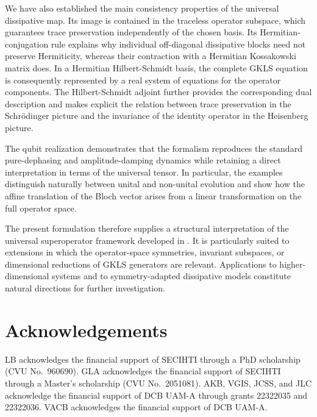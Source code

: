 \documentclass[notitlepage,aip,reprint,onecolumn]{revtex4-1}
\theoremstyle{definition}
\begin{document}
We have also established the main consistency properties of the universal dissipative map. Its image is contained in the traceless operator subspace, which guarantees trace preservation independently of the chosen basis. Its Hermitian-conjugation rule explains why individual off-diagonal dissipative blocks need not preserve Hermiticity, whereas their contraction with a Hermitian Kossakowski matrix does. In a Hermitian Hilbert-Schmidt basis, the complete GKLS equation is consequently represented by a real system of equations for the operator components. The Hilbert-Schmidt adjoint further provides the corresponding dual description and makes explicit the relation between trace preservation in the Schrödinger picture and the invariance of the identity operator in the Heisenberg picture.

The qubit realization demonstrates that the formalism reproduces the standard pure-dephasing and amplitude-damping dynamics while retaining a direct interpretation in terms of the universal tensor. In particular, the examples distinguish naturally between unital and non-unital evolution and show how the affine translation of the Bloch vector arises from a linear transformation on the full operator space.

The present formulation therefore supplies a structural interpretation of the universal superoperator framework developed in \cite{Bixano:2026qce}. It is particularly suited to extensions in which the operator-space symmetries, invariant subspaces, or dimensional reductions of GKLS generators are relevant. Applications to higher-dimensional systems and to symmetry-adapted dissipative models constitute natural directions for further investigation.

\section{Acknowledgements}\label{sec:Acknowledgements}

LB acknowledges the financial support of SECIHTI through
a PhD scholarship (CVU No.~960690).
GLA acknowledges the financial support of SECIHTI through
a Master's scholarship (CVU No.~2051081).
AKB, VGIS, JCSS, and JLC acknowledge the financial support
of DCB UAM-A through grants 22322035 and 22322036.
VACB acknowledges the financial support of DCB UAM-A.


\appendix
\end{document}
